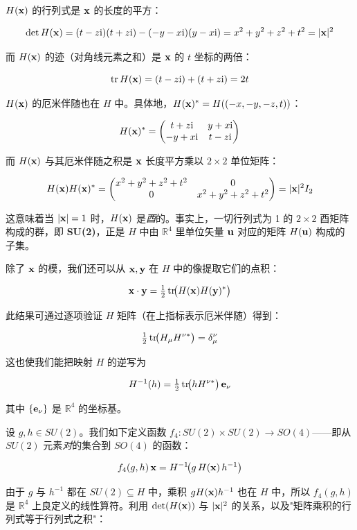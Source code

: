 $H(\mathbf{x})$ 的行列式是 $\mathbf{x}$ 的长度的平方：

\[
\det H(\mathbf{x})=(t-z\mathrm{i})(t+z\mathrm{i})-(-y-x\mathrm{i})(y-x\mathrm{i})=x^{2}+y^{2}+z^{2}+t^{2}=|\mathbf{x}|^{2}
\]

而 $H(\mathbf{x})$ 的迹（对角线元素之和）是 $\mathbf{x}$ 的 $t$ 坐标的两倍：

\[
\operatorname{tr} H(\mathbf{x})=(t-z\mathrm{i})+(t+z\mathrm{i})=2t
\]

$H(\mathbf{x})$ 的厄米伴随也在 $H$ 中。具体地，$H(\mathbf{x})^{*}=H((-x,-y,-z,t))$：

\[
H(\mathbf{x})^{*}=\begin{pmatrix} t+z\mathrm{i} & y+x\mathrm{i}\\ -y+x\mathrm{i} & t-z\mathrm{i}\end{pmatrix}
\]

而 $H(\mathbf{x})$ 与其厄米伴随之积是 $\mathbf{x}$ 长度平方乘以 $2\times2$ 单位矩阵：

\[
H(\mathbf{x})H(\mathbf{x})^{*}=\begin{pmatrix}x^{2}+y^{2}+z^{2}+t^{2} & 0\\ 0 & x^{2}+y^{2}+z^{2}+t^{2}\end{pmatrix}=|\mathbf{x}|^{2}I_{2}
\]

这意味着当 $|\mathbf{x}|=1$ 时，$H(\mathbf{x})$ 是\emph{酉}的。事实上，一切行列式为 1 的 $2\times2$ 酉矩阵构成的群，即 \textbf{SU(2)}，正是 $H$ 中由 $\mathbb{R}^{4}$ 里单位矢量 $\mathbf{u}$ 对应的矩阵 $H(\mathbf{u})$ 构成的子集。

除了 $\mathbf{x}$ 的模，我们还可以从 $\mathbf{x},\mathbf{y}$ 在 $H$ 中的像提取它们的点积：

\[
\mathbf{x}\cdot\mathbf{y}=\tfrac{1}{2}\operatorname{tr}\!\bigl(H(\mathbf{x})H(\mathbf{y})^{*}\bigr)
\]

此结果可通过逐项验证 $H$ 矩阵（在上指标表示厄米伴随）得到：

\[
\tfrac{1}{2}\operatorname{tr}\!\bigl(H_{\mu}H^{\nu*}\bigr)=\delta_{\mu}^{\nu}
\]

这也使我们能把映射 $H$ 的逆写为

\[
H^{-1}(h)=\tfrac{1}{2}\operatorname{tr}\!\bigl(hH^{\nu*}\bigr)\,\mathbf{e}_{\nu}
\]

其中 $\{\mathbf{e}_{\nu}\}$ 是 $\mathbb{R}^{4}$ 的坐标基。

设 $g,h\in SU(2)$。我们如下定义函数 $f_{4}:SU(2)\times SU(2)\to SO(4)$——即从 $SU(2)$ 元素\emph{对}的集合到 $SO(4)$ 的函数：

\[
f_{4}(g,h)\,\mathbf{x}=H^{-1}\!\bigl(g\,H(\mathbf{x})\,h^{-1}\bigr)
\]

由于 $g$ 与 $h^{-1}$ 都在 $SU(2)\subseteq H$ 中，乘积 $gH(\mathbf{x})h^{-1}$ 也在 $H$ 中，所以 $f_{4}(g,h)$ 是 $\mathbb{R}^{4}$ 上良定义的线性算符。利用 $\det(H(\mathbf{x}))$ 与 $|\mathbf{x}|^{2}$ 的关系，以及"矩阵乘积的行列式等于行列式之积"：


